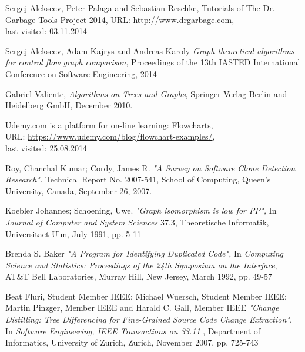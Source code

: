 \documentclass{report}
\begin{document}
\newpage
%
\begin{thebibliography}{100} %

  Sergej Alekseev, Peter Palaga and Sebastian Reschke, Tutorials of The Dr. Garbage Tools Project 2014,  URL: \url{http://www.drgarbage.com}, \\last visited: 03.11.2014

 Sergej Alekseev, Adam Kajrys and Andreas Karoly \emph{ Graph theoretical algorithms for control flow graph comparison}, Proceedings of the 13th IASTED International Conference on Software Engineering, 2014
 
 Gabriel Valiente, \emph{Algorithms on Trees and Graphs}, Springer-Verlag Berlin and Heidelberg GmbH,  December 2010.

 Udemy.com is a platform for on-line learning: Flowcharts,\\ URL: \url{https://www.udemy.com/blog/flowchart-examples/}, \\last visited: 25.08.2014
 
 Roy, Chanchal Kumar; Cordy, James R. \emph{"A Survey on Software Clone Detection Research".} Technical Report No. 2007-541,  School of Computing, Queen's University, Canada, September 26, 2007.

 Koebler Johannes; Schoening, Uwe. \emph{"Graph isomorphism is low for PP",} In \emph{Journal of Computer and System Sciences} 37.3, Theoretische Informatik, Universitaet Ulm, July 1991, pp. 5-11

 Brenda S. Baker \emph{"A Program for Identifying Duplicated Code",} In \emph{Computing Science and Statistics: Proceedings of the 24th Symposium on the Interface},  AT\&T Bell Laboratories, Murray Hill, New Jersey, March 1992, pp. 49-57

 Beat Fluri, Student Member IEEE; Michael Wuersch, Student Member IEEE; Martin Pinzger, Member IEEE and Harald C. Gall, Member IEEE \emph{"Change Distilling: Tree Differencing for Fine-Grained Source Code Change Extraction"}, In \emph{Software Engineering, IEEE Transactions on 33.11 }, Department of Informatics, University of Zurich, Zurich, November 2007, pp. 725-743 


\end{thebibliography}
\end{document}

